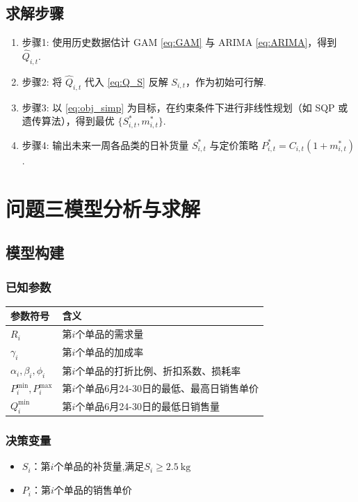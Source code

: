 \documentclass{cumcmthesis}
\begin{document}
\subsection{求解步骤}
\begin{enumerate}
\item 步骤1: 使用历史数据估计 GAM \eqref{eq:GAM} 与 ARIMA \eqref{eq:ARIMA}，得到 $\widehat{Q}_{i,t}$.
\item 步骤2: 将 $\widehat{Q}_{i,t}$ 代入 \eqref{eq:Q_S} 反解 $S_{i,t}$，作为初始可行解.
\item 步骤3: 以 \eqref{eq:obj_simp} 为目标，在约束条件下进行非线性规划（如 SQP 或遗传算法），得到最优 $\{S_{i,t}^*,m_{i,t}^*\}$.
\item 步骤4: 输出未来一周各品类的日补货量 $S_{i,t}^*$ 与定价策略 $P_{i,t}^*=C_{i,t}(1+m_{i,t}^*)$.
\end{enumerate}

\section{问题三模型分析与求解}

\subsection{模型构建}

\subsubsection{已知参数}
\begin{table}[h]
    \centering
    \begin{tabular}{ll}
        \toprule
        参数符号 & 含义 \\
        \midrule
        \( R_i \) & 第\( i \)个单品的需求量 \\
        \( \gamma_i \) & 第\( i \)个单品的加成率 \\
        \( \alpha_i, \beta_i, \phi_i \) & 第\( i \)个单品的打折比例、折扣系数、损耗率 \\
        \( P_i^{\min}, P_i^{\max} \) & 第\( i \)个单品6月24-30日的最低、最高日销售单价 \\
        \( Q_i^{\min} \) & 第\( i \)个单品6月24-30日的最低日销售量 \\
        \bottomrule
    \end{tabular}
\end{table}

\subsubsection{决策变量}
\begin{itemize}
    \item \( S_i \)：第\( i \)个单品的补货量,满足\( S_i \geq 2.5\ \text{kg} \)
    \item \( P_i \)：第\( i \)个单品的销售单价
\end{itemize}
\end{document}
